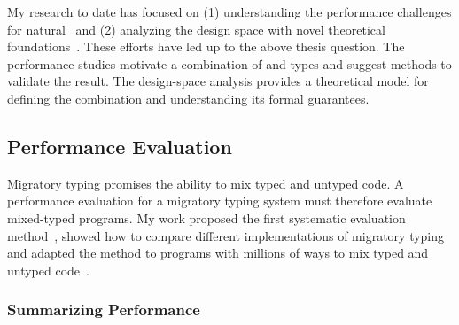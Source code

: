 %
%
%

My research to date has focused on
 (1) understanding the performance challenges for natural~\cite{tfgnvf-popl-2016,gtnffvf-jfp-2019}
 and (2) analyzing the design space with novel theoretical foundations~\cite{gf-icfp-2018}.
These efforts have led up to the above thesis question.
The performance studies motivate a combination of \tdeep{} and \tshallow{}
 types and suggest methods to validate the result.
The design-space analysis provides a theoretical model for defining the
 combination and understanding its formal guarantees.



\subsection{Performance Evaluation}

Migratory typing promises the ability to mix typed and untyped code.
A performance evaluation for a migratory typing system must therefore
 evaluate mixed-typed programs.
My work proposed the first systematic evaluation method~\cite{tfgnvf-popl-2016},
 showed how to compare different implementations of migratory typing~\cite{gtnffvf-jfp-2019}
 and adapted the method to programs with millions
 of ways to mix typed and untyped code~\cite{gm-pepm-2018,gtnffvf-jfp-2019}.



\subsubsection{Summarizing Performance}



